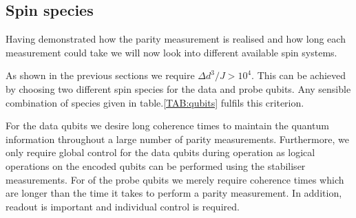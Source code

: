 
\subsection{Spin species}

Having demonstrated how the parity measurement is realised and how long each measurement could take we will now look into different available spin systems. 

As shown in the previous sections we require \hbox{$\Delta d^3/ J > 10^4$}. This can be achieved by choosing two different spin species for the data and probe qubits. Any sensible combination of species given in table.\@ \ref*{TAB:qubits} fulfils this criterion.

For the data qubits we desire long coherence times to maintain the quantum information throughout a large number of parity measurements. Furthermore, we only require global control for the data qubits during operation as logical operations on the encoded qubits can be performed using the stabiliser measurements.
For of the probe qubits we merely require coherence times which are longer than the time it takes to perform a parity measurement. In addition, readout is important and individual control is required.

